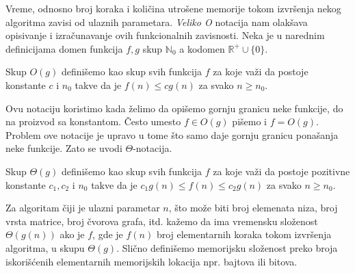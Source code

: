 Vreme, odnosno broj koraka i koli\v cina utro\v sene memorije tokom izvr\v senja nekog algoritma zavisi od ulaznih parametara. \textit{Veliko O} notacija nam olak\v sava opisivanje i izra\v cunavanje ovih funkcionalnih zavisnosti. Neka je u narednim definicijama domen funkcija $f, g$ skup $\mathbb{N}_0$ a kodomen $\mathbb{R}^{+} \cup \{ 0 \}$.

\begin{dfn}
Skup $O(g)$ defini\v semo kao skup svih funkcija $f$ za koje va\v zi da postoje konstante $c$ i $n_0$ takve da je $f(n) \leq c g(n)$ za svako $n \geq n_0$.
\end{dfn}

Ovu notaciju koristimo kada \v zelimo da opi\v semo gornju granicu neke funkcije, do na proizvod sa konstantom. \v Cesto umesto $f \in O(g)$ pi\v semo i $f = O(g)$. Problem ove notacije je upravo u tome \v sto samo daje gornju granicu pona\v sanja neke funkcije. Zato se uvodi $\Theta$-notacija.

\begin{dfn}
Skup $\Theta(g)$ defini\v semo kao skup svih funkcija $f$ za koje va\v zi da postoje pozitivne konstante $c_1, c_2$ i $n_0$ takve da je $c_1 g(n) \leq f(n) \leq c_2 g(n)$ za svako $n \geq n_0$.
\end{dfn}

Za algoritam \v ciji je ulazni parametar $n$, \v sto mo\v ze biti broj elemenata niza, broj vrsta matrice, broj \v cvorova grafa, itd. ka\v zemo da ima vremensku slo\v zenost $\Theta(g(n))$ ako je $f$, gde je $f(n)$ broj elementarnih koraka tokom izvr\v senja algoritma, u skupu $\Theta(g)$. Sli\v cno defini\v semo memorijsku slo\v zenost preko broja iskori\v s\' cenih elementarnih memorijskih lokacija npr. bajtova ili bitova.

